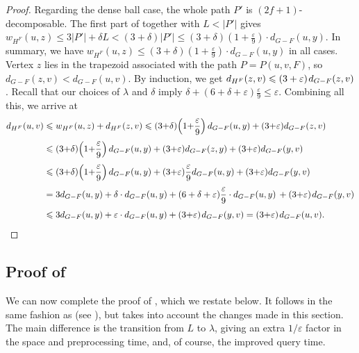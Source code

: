 \documentclass{article}\usepackage[a4paper,margin=20mm]{geometry}
\newcommand{\RestateGo}[1]{\renewcommand{#1}{(Restated)}}
\newcommand*{\length}[1]{|#1|}
\newcommand*{\nwspace}{\hspace*{.1em}}
\renewcommand{\le}{\leqslant}
\newcommand{\eps}{\varepsilon}
\begin{document}
\begin{proof}
  	Regarding the dense ball case, the whole path $P'$ is $(2f{+}1)$-decomposable.
	The first part of 
	together with $L < \length{P'}$ gives
	$w_{H^F}(u,z) \le 3 \length{P'} + \delta L < (3+\delta) \length{P'} \le
	(3+\delta)(1+ \tfrac{\eps}{9}) \cdot d_{G-F}(u,y)$.
%	
	In summary, we have $w_{H^F}(u,z) \le (3+\delta)(1+ \tfrac{\eps}{9}) \cdot d_{G-F}(u,y)$
	in all cases.
	Vertex $z$ lies in the trapezoid associated with the path $P = P(u,v,F)$,
	so $d_{G-F}(z,v) < d_{G-F}(u,v)$.
	By induction, we get $d_{H^F}(z,v) \le (3+\varepsilon) \nwspace d_{G-F}(z,v)$.
	Recall that our choices of $\lambda$ and $\delta$ imply
	$\delta +  (6 + \delta + \varepsilon) \frac{\varepsilon}{9} \le \varepsilon$.
	Combining all this, we arrive at
	\begin{align*}
    d_{H^F}(u,v) &\le w_{H^F}(u,z) + d_{H^F}(z,v)
       \le (3{+}\delta)\! \left(1{+}\frac{\varepsilon}{9}\right)  d_{G-F}(u,y)
        + (3{+}\eps)  d_{G-F}(z,v)\\[.33em]
      &\le (3{+}\delta)\! \left(1{+}\frac{\varepsilon}{9}\right)  d_{G-F}(u,y)
        + (3{+}\eps)  d_{G-F}(z,y) + (3{+}\eps)  d_{G-F}(y,v)\\[.33em]
      &\le (3{+}\delta)\! \left(1{+}\frac{\varepsilon}{9}\right)  d_{G-F}(u,y)
        + (3{+}\eps)\frac{\varepsilon}{9}  d_{G-F}(u,y) + (3{+}\eps)  d_{G-F}(y,v)\\[.33em]
      &= 3 d_{G-F}(u,y) + \delta \cdot d_{G-F}(u,y) +
       (6 + \delta + \varepsilon) \frac{\varepsilon}{9} \cdot d_{G-F}(u,y)\, +
      	(3{+}\eps) \nwspace d_{G-F}(y,v)\\[.33em]
      &\le 3 d_{G-F}(u,y) + \varepsilon \cdot  d_{G-F}(u,y) + (3{+}\eps) \nwspace d_{G-F}(y,v)
       = (3{+}\eps) \nwspace d_{G-F}(u,v). \qedhere
\end{align*}
\end{proof}


\subsection{Proof of \texorpdfstring{}{Theorem 1.1}}
\label{subsec:proof_main_theorem}

We can now complete the proof of , which we restate below.
It follows in the same fashion as 
(see ),
but takes into account the changes made in this section.
The main difference is the transition from $L$ to $\lambda$,
giving an extra $1/\varepsilon$ factor in the space and preprocessing time,
and, of course, the improved query time.
\RestateGo{\restateoraclelongpaths}
\oraclelongpaths*
\end{document}
